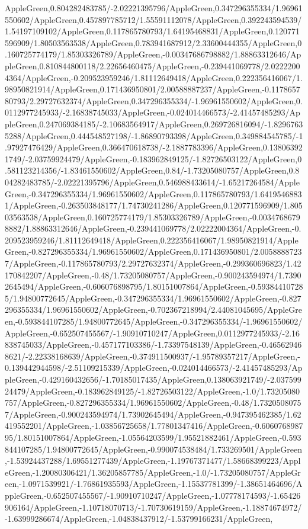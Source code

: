 {\begin{tikzternal}
AppleGreen,0.804282483785/-2.02221395796/AppleGreen,0.347296355334/1.96961550602/AppleGreen,0.457897785712/1.55591112078/AppleGreen,0.392243594539/1.54197109102/AppleGreen,0.117865780793/1.64195468831/AppleGreen,0.120771596909/1.80503563538/AppleGreen,0.783941687912/2.33600444355/AppleGreen,0.160725774179/1.85303326789/AppleGreen,-0.00347686798882/1.88863312646/AppleGreen,0.810844800118/2.22656460475/AppleGreen,-0.239441069778/2.02222004364/AppleGreen,-0.209523959246/1.81112649418/AppleGreen,0.222356416067/1.98950821914/AppleGreen,0.171436950801/2.00588887237/AppleGreen,-0.117865780793/2.29727632374/AppleGreen,0.347296355334/-1.96961550602/AppleGreen,0.0112977245933/-2.16838745033/AppleGreen,-0.024014466573/-2.41457485293/AppleGreen,0.247069384185/-2.10683564917/AppleGreen,0.269726816094/-1.82967635288/AppleGreen,0.444548527198/-1.86890793398/AppleGreen,0.349884545785/-1.97927476429/AppleGreen,0.366470618738/-2.1887783396/AppleGreen,0.138063921749/-2.03759924479/AppleGreen,-0.183962849125/-1.82726503122/AppleGreen,0.581123214356/-1.83461550602/AppleGreen,0.84/-1.73205080757/AppleGreen,0.804282483785/-2.02221395796/AppleGreen,0.546988433614/-1.65217264584/AppleGreen,-0.347296355334/1.96961550602/AppleGreen,0.117865780793/1.64195468831/AppleGreen,-0.263503848177/1.74730241286/AppleGreen,0.120771596909/1.80503563538/AppleGreen,0.160725774179/1.85303326789/AppleGreen,-0.00347686798882/1.88863312646/AppleGreen,-0.239441069778/2.02222004364/AppleGreen,-0.209523959246/1.81112649418/AppleGreen,0.222356416067/1.98950821914/AppleGreen,-0.827296355334/1.96961550602/AppleGreen,0.171436950801/2.00588887237/AppleGreen,-0.117865780793/2.29727632374/AppleGreen,-0.299360696823/1.42170842207/AppleGreen,-0.48/1.73205080757/AppleGreen,-0.900243594974/1.73902645494/AppleGreen,-0.606076898795/1.80151007864/AppleGreen,-0.593844107285/1.94800772645/AppleGreen,-0.347296355334/1.96961550602/AppleGreen,-0.827296355334/1.96961550602/AppleGreen,-0.702367218994/2.44081045695/AppleGreen,-0.593844107285/1.94800772645/AppleGreen,-0.347296355334/-1.96961550602/AppleGreen,-0.652507455567/-1.90910710247/AppleGreen,0.0112977245933/-2.16838745033/AppleGreen,-0.457177103386/-1.73397548139/AppleGreen,-0.465629468621/-2.22338168639/AppleGreen,-0.374911500937/-1.95789357217/AppleGreen,-0.139442944598/-2.51109215339/AppleGreen,-0.024014466573/-2.41457485293/AppleGreen,-0.429160432656/-1.70185017435/AppleGreen,0.138063921749/-2.03759924479/AppleGreen,-0.183962849125/-1.82726503122/AppleGreen,-1.0/1.73205080757/AppleGreen,-0.827296355334/1.96961550602/AppleGreen,-0.48/1.73205080757/AppleGreen,-0.900243594974/1.73902645494/AppleGreen,-0.947395462385/1.62419552201/AppleGreen,-1.03856725658/1.77801347416/AppleGreen,-0.606076898795/1.80151007864/AppleGreen,-1.05564203599/1.95521882461/AppleGreen,-0.593844107285/1.94800772645/AppleGreen,-0.990074538484/1.733269501/AppleGreen,-1.53924437288/1.69551277439/AppleGreen,-1.19767371477/1.58668399223/AppleGreen,-1.20080306421/1.36205857785/AppleGreen,-1.0/-1.73205080757/AppleGreen,-1.0971539921/-1.76861935593/AppleGreen,-1.15537781399/-1.38651464696/AppleGreen,-0.652507455567/-1.90910710247/AppleGreen,-1.07778174593/-1.65426906164/AppleGreen,-1.10718070713/-1.70730619159/AppleGreen,-1.18874674972/-1.63999286674/AppleGreen,-1.04838437912/-1.53799166231/AppleGreen,
\end{tikzternal}}
